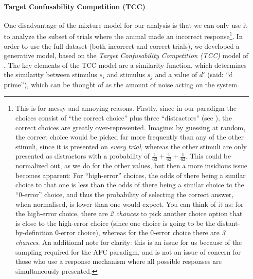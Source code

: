 \paragraph{Target Confusability Competition (TCC)}\label{para:TCC}
One disadvantage of the mixture model for our analysis is that we can only use it to analyze the subset of trials where the animal made an incorrect response\footnote{
This is for messy and annoying reasons. 
Firstly, since in our paradigm the choices consist of ``the correct choice'' plus three ``distractors'' (see ), the correct choices are greatly over-represented. 
Imagine: by guessing at random, the correct choice would be picked far more frequently than any of the other stimuli, since it is presented on \emph{every trial}, whereas the other stimuli are only presented as distractors with a probability of $\frac{1}{63} + \frac{1}{62} + \frac{1}{62}$. 
This could be normalized out, as we do for the other values, but then a more insidious issue becomes apparent: 
For ``high-error'' choices, the odds of there being a similar choice to that one is less than the odds of there being a similar choice to the ``0-error'' choice, and thus the probability of selecting the correct answer, when normalised, is lower than one would expect. 
You can think of it as: for the high-error choice, there are \emph{2 chances} to pick another choice option that is close to the high-error choice (since one choice is going to be the distant-by-definition 0-error choice), whereas for the 0-error choice there are \emph{3 chances}.
An additional note for clarity: this is an issue for us because of the sampling required for the AFC paradigm, and is not an issue of concern for those who use a response mechanism where all possible responses are simultaneously presented.
}.
In order to use the full dataset (both incorrect and correct trials), we developed a generative model, based on the \emph{Target Confusability Competition (TCC)} model of \cite{schurgin_psychophysical_2020}.
The key elements of the TCC model are a similarity function, which determines the similarity between stimulus $s_i$ and stimulus $s_j$ and a value of $d'$ (said: ``d prime''), which can be thought of as the amount of noise acting on the system. 
